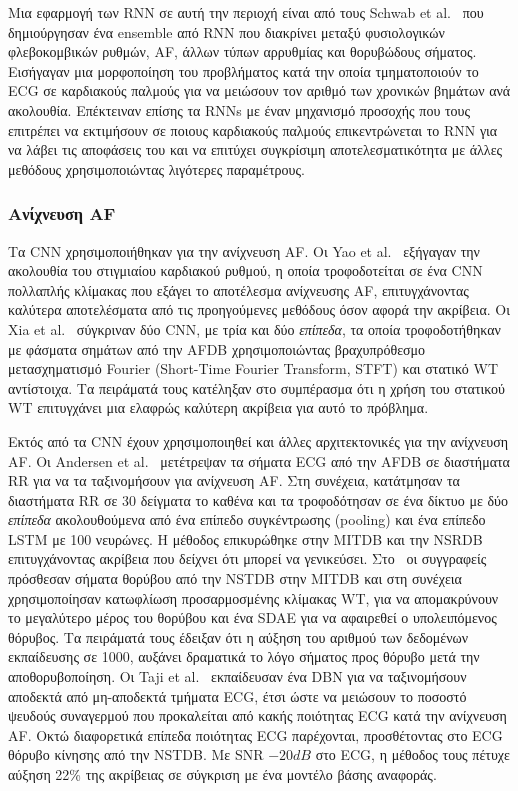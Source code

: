 \begin{sidewaystable}
\begin{tabular}{l c l l}
		\bottomrule
	\end{tabular}
\end{sidewaystable}

Μια εφαρμογή των RNN σε αυτή την περιοχή είναι από τους Schwab et al.~\cite{schwab2017beat} που δημιούργησαν ένα ensemble από RNN που διακρίνει μεταξύ φυσιολογικών φλεβοκομβικών ρυθμών, AF, άλλων τύπων αρρυθμίας και θορυβώδους σήματος.
Εισήγαγαν μια μορφοποίηση του προβλήματος κατά την οποία τμηματοποιούν το ECG σε καρδιακούς παλμούς για να μειώσουν τον αριθμό των χρονικών βημάτων ανά ακολουθία.
Επέκτειναν επίσης τα RNNs με έναν μηχανισμό προσοχής που τους επιτρέπει να εκτιμήσουν σε ποιους καρδιακούς παλμούς επικεντρώνεται το RNN για να λάβει τις αποφάσεις του και να επιτύχει συγκρίσιμη αποτελεσματικότητα με άλλες μεθόδους χρησιμοποιώντας λιγότερες παραμέτρους.

\subsubsection{Ανίχνευση AF}
Τα CNN χρησιμοποιήθηκαν για την ανίχνευση AF\@.
Οι Yao et al.~\cite{yao2017atrial} εξήγαγαν την ακολουθία του στιγμιαίου καρδιακού ρυθμού, η οποία τροφοδοτείται σε ένα CNN πολλαπλής κλίμακας που εξάγει το αποτέλεσμα ανίχνευσης AF, επιτυγχάνοντας καλύτερα αποτελέσματα από τις προηγούμενες μεθόδους όσον αφορά την ακρίβεια.
Οι Xia et al.~\cite{xia2018detecting} σύγκριναν δύο CNN, με τρία και δύο \textit{επίπεδα}, τα οποία τροφοδοτήθηκαν με φάσματα σημάτων από την AFDB χρησιμοποιώντας βραχυπρόθεσμο μετασχηματισμό Fourier (Short-Time Fourier Transform, STFT) και στατικό WT αντίστοιχα.
Τα πειράματά τους κατέληξαν στο συμπέρασμα ότι η χρήση του στατικού WT επιτυγχάνει μια ελαφρώς καλύτερη ακρίβεια για αυτό το πρόβλημα.

Εκτός από τα CNN έχουν χρησιμοποιηθεί και άλλες αρχιτεκτονικές για την ανίχνευση AF\@.
Οι Andersen et al.~\cite{andersen2018deep} μετέτρεψαν τα σήματα ECG από την AFDB σε διαστήματα RR για να τα ταξινομήσουν για ανίχνευση AF\@.
Στη συνέχεια, κατάτμησαν τα διαστήματα RR σε 30 δείγματα το καθένα και τα τροφοδότησαν σε ένα δίκτυο με δύο \textit{επίπεδα} ακολουθούμενα από ένα επίπεδο συγκέντρωσης (pooling) και ένα επίπεδο LSTM με 100 νευρώνες.
Η μέθοδος επικυρώθηκε στην MITDB και την NSRDB επιτυγχάνοντας ακρίβεια που δείχνει ότι μπορεί να γενικεύσει.
Στο~\cite{xiong2015denoising} οι συγγραφείς πρόσθεσαν σήματα θορύβου από την NSTDB στην MITDB και στη συνέχεια χρησιμοποίησαν κατωφλίωση προσαρμοσμένης κλίμακας WT, για να απομακρύνουν το μεγαλύτερο μέρος του θορύβου και ένα SDAE για να αφαιρεθεί ο υπολειπόμενος θόρυβος.
Τα πειράματά τους έδειξαν ότι η αύξηση του αριθμού των δεδομένων εκπαίδευσης σε 1000, αυξάνει δραματικά το λόγο σήματος προς θόρυβο μετά την αποθορυβοποίηση.
Οι Taji et al.~\cite{taji2017false} εκπαίδευσαν ένα DBN για να ταξινομήσουν αποδεκτά από μη-αποδεκτά τμήματα ECG, έτσι ώστε να μειώσουν το ποσοστό ψευδούς συναγερμού που προκαλείται από κακής ποιότητας ECG κατά την ανίχνευση AF\@.
Οκτώ διαφορετικά επίπεδα ποιότητας ECG παρέχονται, προσθέτοντας στο ECG θόρυβο κίνησης από την NSTDB\@.
Με SNR $-20dB$ στο ECG, η μέθοδος τους πέτυχε αύξηση 22\% της ακρίβειας σε σύγκριση με ένα μοντέλο βάσης αναφοράς.

